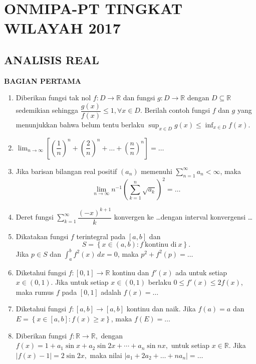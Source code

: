 \documentclass[12pt,twoside]{article}
\begin{document}
\section{ONMIPA-PT TINGKAT WILAYAH 2017}
\subsection{ANALISIS REAL}
\textbf{BAGIAN PERTAMA}
\begin{enumerate}
	\item Diberikan fungsi tak nol $f : D \to \mathbb{R}$ dan fungsi $g : D \to \mathbb{R}$ dengan $D \subseteq \mathbb{R}$ sedemikian sehingga $\dfrac{g(x)}{f(x)}\leq 1, \forall x \in D$. Berilah contoh fungsi $f$ dan $g$ yang menunjukkan bahwa belum tentu berlaku $\displaystyle\sup_{x \in D} g(x) \leq \inf_{x \in D} f(x)$.

	\item $\displaystyle\lim_{n \to \infty} \left[ \left(\dfrac{1}{n}\right)^n + \left(\dfrac{2}{n}\right)^n +\dots+ \left(\dfrac{n}{n}\right)^n \right] = \dots$

	\item Jika barisan bilangan real positif $(a_n)$ memenuhi $\displaystyle\sum_{n=1}^{\infty} a_n < \infty$, maka
	      \begin{equation*}
		      \displaystyle\lim_{n \to \infty} n^{-1} \left( \sum_{k=1}^{n} \sqrt{a_k} \right)^2 =\dots
	      \end{equation*}

	\item Deret fungsi $\displaystyle\sum_{k=1}^{\infty} \dfrac{(-x)^{k+1}}{k}$ konvergen ke \dots dengan interval konvergensi \dots

	\item Dikatakan fungsi $f$ terintegral pada $[a,b]$ dan
	      \begin{equation*}
		      S = \left\lbrace x \in (a,b) : f~\text{kontinu di}~x \right\rbrace.
	      \end{equation*}
	      Jika $p \in S$ dan $\displaystyle\int_{a}^{b} f^2(x)\,dx = 0$, maka $p^2 + f^2(p) =\dots $

	\item Diketahui fungsi $f : [0,1] \to \mathbb{R}$ kontinu dan $f'(x)$ ada untuk setiap $x \in (0,1)$. Jika untuk setiap $x \in (0,1)$ berlaku $0 \leq f'(x) \leq 2f(x)$, maka rumus $f$ pada $[0,1]$ adalah $f(x) = \dots$

	\item Diketahui fungsi $f : [a,b] \to [a,b]$ kontinu dan naik. Jika $f(a)=a$ dan $E = \left\lbrace x \in [a,b] : f(x) \geq x \right\rbrace$, maka $f(E) =\dots$

	\item Diberikan fungsi $f : \mathbb{R} \to \mathbb{R},$ dengan $f(x) =  1 + a_1\sin x +a_2 \sin 2x + \cdots+ a_n \sin nx,$ untuk setiap $x \in \mathbb{R}$. Jika $|f(x)-1| = 2 \sin 2x,$ maka nilai $|a_1 + 2a_2 +\dots + na_n| =\dots $

\end{enumerate}
\end{document}
